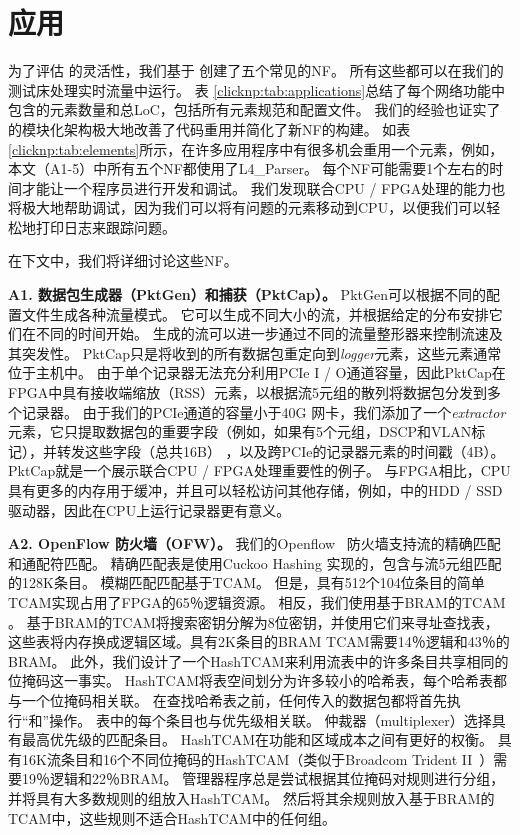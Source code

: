 \section{应用}
\label{clicknp:sec:application}

为了评估 \name 的灵活性，我们基于 \name 创建了五个常见的NF。
所有这些都可以在我们的测试床处理实时流量中运行。
表 \ref {clicknp:tab:applications}总结了每个网络功能中包含的元素数量和总LoC，包括所有元素规范和配置文件。
我们的经验也证实了\name 的模块化架构极大地改善了代码重用并简化了新NF的构建。
如表 \ref {clicknp:tab:elements}所示，在许多应用程序中有很多机会重用一个元素，例如，本文（A1-5）中所有五个NF都使用了L4\_Parser。
每个NF可能需要1个左右的时间才能让一个程序员进行开发和调试。
我们发现联合CPU / FPGA处理的能力也将极大地帮助调试，因为我们可以将有问题的元素移动到CPU，以便我们可以轻松地打印日志来跟踪问题。

在下文中，我们将详细讨论这些NF。

\textbf {A1. 数据包生成器（PktGen）和捕获（PktCap）。}
PktGen可以根据不同的配置文件生成各种流量模式。
它可以生成不同大小的流，并根据给定的分布安排它们在不同的时间开始。
生成的流可以进一步通过不同的流量整形器来控制流速及其突发性。
PktCap只是将收到的所有数据包重定向到\textit {logger}元素，这些元素通常位于主机中。
由于单个记录器无法充分利用PCIe I / O通道容量，因此PktCap在FPGA中具有接收端缩放（RSS）元素，以根据流5元组的散列将数据包分发到多个记录器。
由于我们的PCIe通道的容量小于40G 网卡，我们添加了一个\textit {extractor}元素，它只提取数据包的重要字段（例如，如果有5个元组，DSCP和VLAN标记），并转发这些字段（总共16B） ，以及跨PCIe的记录器元素的时间戳（4B）。
PktCap就是一个展示联合CPU / FPGA处理重要性的例子。
与FPGA相比，CPU具有更多的内存用于缓冲，并且可以轻松访问其他存储，例如，\cite{lee2015flosis}中的HDD / SSD驱动器，因此在CPU上运行记录器更有意义。


\textbf {A2. OpenFlow 防火墙（OFW）。}
我们的Openflow~\cite {mckeown2008openflow} 防火墙支持流的精确匹配和通配符匹配。
精确匹配表是使用Cuckoo Hashing \cite{cuckoo} 实现的，包含与流5元组匹配的128K条目。
模糊匹配匹配基于TCAM。
	但是，具有512个104位条目的简单TCAM实现占用了FPGA的65％逻辑资源。
	相反，我们使用基于BRAM的TCAM \cite {jiang2013scalable}。
	基于BRAM的TCAM将搜索密钥分解为8位密钥，并使用它们来寻址查找表，这些表将内存换成逻辑区域。具有2K条目的BRAM TCAM需要14％逻辑和43％的BRAM。
	此外，我们设计了一个HashTCAM来利用流表中的许多条目共享相同的位掩码这一事实。
	HashTCAM将表空间划分为许多较小的哈希表，每个哈希表都与一个位掩码相关联。
	在查找哈希表之前，任何传入的数据包都将首先执行“和”操作。
	表中的每个条目也与优先级相关联。
	仲裁器（multiplexer）选择具有最高优先级的匹配条目。
	HashTCAM在功能和区域成本之间有更好的权衡。
	具有16K流条目和16个不同位掩码的HashTCAM（类似于Broadcom Trident II~\cite {broadcomethernet}）需要19％逻辑和22％BRAM。
	管理器程序总是尝试根据其位掩码对规则进行分组，并将具有大多数规则的组放入HashTCAM。
	然后将其余规则放入基于BRAM的TCAM中，这些规则不适合HashTCAM中的任何组。


